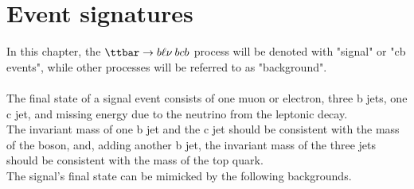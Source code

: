\label{sec:Events}
\vspace{-1cm}
\minitoc


\section{Event signatures}
In this chapter, the $\ttbar \to b\ell\nu \: bcb$ process will be denoted with "signal" or "cb events", while other processes will be referred to as "background".\\
\\
The final state of a signal event consists of one muon or electron, three b jets, one c jet, and missing energy due to the neutrino from the leptonic \PW decay.\\
The invariant mass of one b jet and the c jet should be consistent with the mass of the \PW boson, and, adding another b jet, the invariant mass of the three jets should be consistent with the mass of the top quark.\\
The signal's final state can be mimicked by the following backgrounds.
